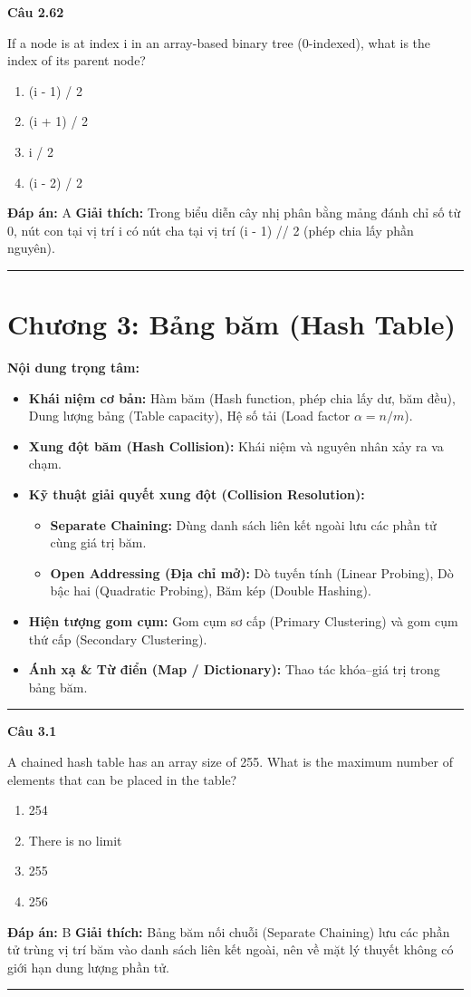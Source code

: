 \documentclass[11pt,a4paper]{article}
\newenvironment{question}[1]{%
  \par\vspace{1em}\noindent\textbf{\large Câu #1}\par\vspace{0.4em}
}{%
  \par\vspace{1em}\hrule\vspace{0.6em}
}
\newenvironment{choices}{%
  \begin{enumerate}[label=\textbf{\Alph*.},leftmargin=2.2em,itemsep=2pt,topsep=3pt]
}{%
  \end{enumerate}
}
\newcommand{\choice}{\item}
\begin{document}
\begin{question}{2.62}
If a node is at index i in an array-based binary tree (0-indexed), what is the index of its parent node?
\begin{choices}
\choice (i - 1) / 2
\choice (i + 1) / 2
\choice i / 2
\choice (i - 2) / 2
\end{choices}
\textbf{Đáp án:} A
\textbf{Giải thích:} Trong biểu diễn cây nhị phân bằng mảng đánh chỉ số từ 0, nút con tại vị trí i có nút cha tại vị trí (i - 1) // 2 (phép chia lấy phần nguyên).
\end{question}

\newpage
\section*{Chương 3: Bảng băm (Hash Table)}

\noindent\textbf{Nội dung trọng tâm:}
\begin{itemize}[noitemsep,topsep=3pt]
  \item \textbf{Khái niệm cơ bản:} Hàm băm (Hash function, phép chia lấy dư, băm đều), Dung lượng bảng (Table capacity), Hệ số tải (Load factor $\alpha = n/m$).
  \item \textbf{Xung đột băm (Hash Collision):} Khái niệm và nguyên nhân xảy ra va chạm.
  \item \textbf{Kỹ thuật giải quyết xung đột (Collision Resolution):}
    \begin{itemize}[noitemsep]
      \item \textbf{Separate Chaining:} Dùng danh sách liên kết ngoài lưu các phần tử cùng giá trị băm.
      \item \textbf{Open Addressing (Địa chỉ mở):} Dò tuyến tính (Linear Probing), Dò bậc hai (Quadratic Probing), Băm kép (Double Hashing).
    \end{itemize}
  \item \textbf{Hiện tượng gom cụm:} Gom cụm sơ cấp (Primary Clustering) và gom cụm thứ cấp (Secondary Clustering).
  \item \textbf{Ánh xạ \& Từ điển (Map / Dictionary):} Thao tác khóa--giá trị trong bảng băm.
\end{itemize}
\bigskip
\hrule
\bigskip

\begin{question}{3.1}
A chained hash table has an array size of 255. What is the maximum number of elements that can be placed in the table?
\begin{choices}
\choice 254
\choice There is no limit
\choice 255
\choice 256
\end{choices}
\textbf{Đáp án:} B
\textbf{Giải thích:} Bảng băm nối chuỗi (Separate Chaining) lưu các phần tử trùng vị trí băm vào danh sách liên kết ngoài, nên về mặt lý thuyết không có giới hạn dung lượng phần tử.
\end{question}
\end{document}
